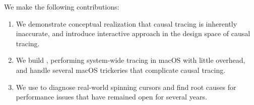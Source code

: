 We make the following contributions: 
\begin{enumerate}

\item We demonstrate conceptual realization that causal tracing is inherently
inaccurate, and introduce interactive approach in the design space of causal
tracing.

\item We build \xxx, performing system-wide tracing in macOS with little
overhead, and handle several macOS trickeries that complicate causal tracing.

\item We use \xxx to diagnose real-world spinning cursors and find root causes for
performance issues that have remained open for several years.

\end{enumerate}

